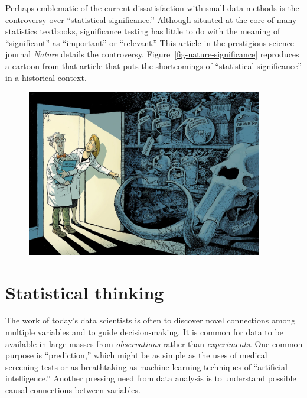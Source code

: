 \documentclass[
  letterpaper,
  DIV=11,
  numbers=noendperiod,
  oneside]{scrreprt}
\begin{document}
Perhaps emblematic of the current dissatisfaction with small-data
methods is the controversy over ``statistical significance.'' Although
situated at the core of many statistics textbooks, significance testing
has little to do with the meaning of ``significant'' as ``important'' or
``relevant.'' \href{www/d41586-019-00857-9.pdf}{This article} in the
prestigious science journal \emph{Nature} details the controversy.
Figure~\ref{fig-nature-significance} reproduces a cartoon from that
article that puts the shortcomings of ``statistical significance'' in a
historical context.

\begin{figure}


{\centering \includegraphics[width=4.06in,height=\textheight]{./www/Significance-cartoon.png}

}

\end{figure}

\hypertarget{statistical-thinking}{%
\section*{Statistical thinking}\label{statistical-thinking}}


The work of today's data scientists is often to discover novel
connections among multiple variables and to guide decision-making. It is
common for data to be available in large masses from \emph{observations}
rather than \emph{experiments}. One common purpose is ``prediction,''
which might be as simple as the uses of medical screening tests or as
breathtaking as machine-learning techniques of ``artificial
intelligence.'' Another pressing need from data analysis is to
understand possible causal connections between variables.
\end{document}

